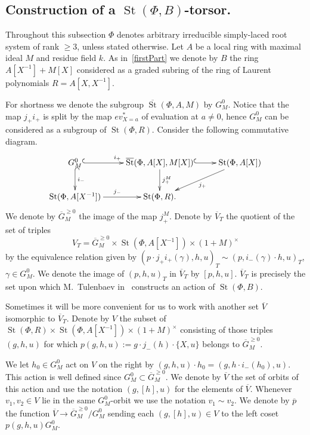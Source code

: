 \documentclass[oneside, 8pt]{amsart}
\theoremstyle{remark}
\theoremstyle{definition}
\numberwithin{lemma}{section}
\numberwithin{prop}{section}
\numberwithin{corollary}{section}
\numberwithin{externaltheorem}{section}
\DeclareMathOperator{\St}{St}
\newcommand{\inv}{^{-1}}
\numberwithin{equation}{section}
\begin{document}
\subsection{Construction of a \texorpdfstring{$\St(\Phi, B)$}{St(B)}-torsor.} \label{sec:V-construction}
Throughout this subsection $\Phi$ denotes arbitrary irreducible simply-laced root system of rank $\geq 3$, unless stated otherwise. Let $A$ be a local ring with maximal ideal $M$ and residue field $k$. As in~\cref{firstPart} we denote by $B$ the ring $A[X\inv] + M[X]$ considered as a graded subring of the ring of Laurent polynomials $R = A[X, X\inv]$.

For shortness we denote the subgroup $\overline{\St}(\Phi, A, M)$ by $G_M^0$.
Notice that the map $j_+i_+$ is split by the map $ev^*_{X=a}$ of evaluation at $a\neq 0$, hence $G_M^0$ can be considered as a subgroup of $\St(\Phi, R)$. Consider the following commutative diagram.
\[ \xymatrix{ G_M^0 \ar@{^{(}->}[r]^{i_+} \ar@{^{(}->}[d]^{i_-} & \overline{\St}(\Phi, A[X], M[X]) \ar^{j_+^M}[d] \ar@{^{(}->}[r] & \St(\Phi, A[X]) \ar[dl]^{j_+} \\
              \St(\Phi, A[X\inv]) \ar[r]^{j_-} & \St(\Phi, R). &  } \] 
We denote by $\overline{G}^{\geq 0}_M$ the image of the map $j_+^M$.               
Denote by $\overline{V}_T$ the quotient of the set of triples 
\[V_T = \overline{G}_M^{\geq 0} \times \St(\Phi, A[X\inv]) \times (1+M)^\times\] by the equivalence relation given by $(p \cdot j_+i_+(\gamma), h, u)_T \sim (p, i_-(\gamma) \cdot h, u)_T$, $\gamma \in G^0_M$. We denote the image of $(p, h, u)_T$ in $\overline{V}_T$ by $[p, h, u]$.
$\overline{V}_T$ is precisely the set upon which M.~Tulenbaev in~\cite[Proposition~4.3]{Tu83} constructs an action of $\St(\Phi, B)$.

Sometimes it will be more convenient for us to work with another set $\overline{V}$ isomorphic to $\overline{V}_T$. Denote by $V$ the subset of $\St(\Phi, R) \times \St(\Phi, A[X\inv]) \times (1 + M)^\times$ consisting of those triples $(g, h, u)$ for which $p(g, h, u) := g \cdot j_-(h) \cdot \{ X, u \}$ belongs to $\overline{G}_M^{\geq 0}$. 

We let $h_0 \in G_M^0$ act on $V$ on the right by $(g, h, u) \cdot h_0 = (g, h \cdot i_-(h_0), u)$. This action is well defined since $G^0_M \subset \overline{G}^{\geq 0}_M$.
We denote by $\overline{V}$ the set of orbits of this action and use the notation $(g, [h], u)$ for the elements of $\overline{V}$.
Whenever $v_1, v_2 \in V$ lie in the same $G_M^0$-orbit we use the notation $v_1 \sim v_2$.
We denote by $\overline{p}$ the function $\overline{V} \to \overline{G}^{\geq 0}_M/G_M^0$ sending each $(g, [h], u) \in V$ to the left coset $p(g, h, u)G_M^0$.
\end{document}
